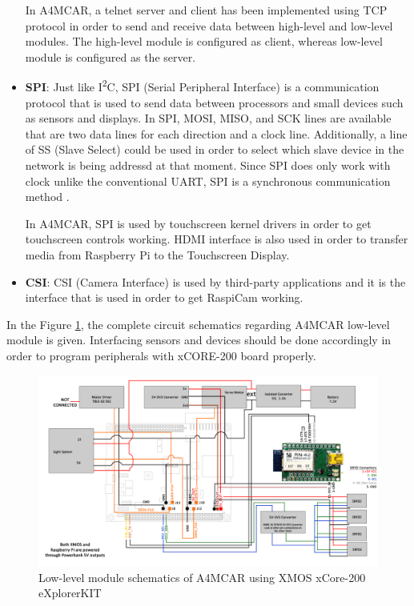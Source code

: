 \begin{itemize}
	In A4MCAR, a telnet server and client has been implemented using TCP protocol in order to send and receive data between high-level and low-level modules. The high-level module is configured as client, whereas low-level module is configured as the server. 
	\item \textbf{SPI}: Just like I\textsuperscript{2}C, SPI (Serial Peripheral Interface) is a communication protocol that is used to send data between processors and small devices such as sensors and displays. In SPI, MOSI, MISO, and SCK lines are available that are two data lines for each direction and a clock line. Additionally, a line of SS (Slave Select) could be used in order to select which slave device in the network is being addressd at that moment. Since SPI does only work with clock unlike the conventional UART, SPI is a synchronous communication method \cite{spi}.
	
	In A4MCAR, SPI is used by touchscreen kernel drivers in order to get touchscreen controls working. HDMI interface is also used in order to transfer media from Raspberry Pi to the Touchscreen Display.
	\item \textbf{CSI}: CSI (Camera Interface) is used by third-party applications and it is the interface that is used in order to get RaspiCam working.
\end{itemize}

In the Figure \ref{fig:RCCAR_Schematics}, the complete circuit schematics regarding A4MCAR low-level module is given. Interfacing sensors and devices should be done accordingly in order to program peripherals with xCORE-200 board properly. 
\begin{figure}[!ht]
	\includegraphics[scale=0.25]{content/images/RCCAR_Schematics.png}
	\caption{Low-level module schematics of A4MCAR using XMOS xCore-200 eXplorerKIT}
	\label{fig:RCCAR_Schematics}
\end{figure}
